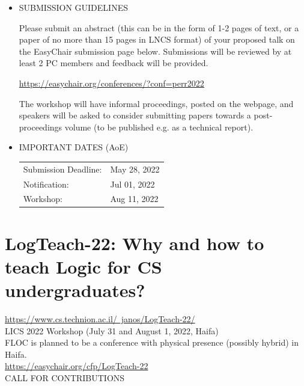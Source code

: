 \documentclass[prodmode,acmtecs]{acmsmall} %
\begin{document}
\begin{itemize}
\item  SUBMISSION GUIDELINES 
 
  Please submit an abstract (this can be in the form of 1-2 pages of text, or a paper of no more than 15 pages in LNCS format) of your proposed talk on the EasyChair submission page below. Submissions will be reviewed by at least 2 PC members and feedback will be provided. 
 
 \href{https://easychair.org/conferences/?conf=perr2022}{https://easychair.org/conferences/?conf=perr2022} 
 
  The workshop will have informal proceedings, posted on the webpage, and speakers will be asked to consider submitting papers towards a post-proceedings volume (to be published e.g. as a technical report). 
 
\item  IMPORTANT DATES (AoE)  
 
\begin{tabulary}{\linewidth}{LL}Submission Deadline:  & May 28, 2022 \\
Notification:  & Jul 01, 2022 \\
Workshop:  & Aug 11, 2022 \\
\end{tabulary}
 
\end{itemize}\section{LogTeach-22: Why and how to teach Logic for CS undergraduates? }\label{LogTeach22}  \href{https://www.cs.technion.ac.il/~janos/LogTeach-22/}{https://www.cs.technion.ac.il/~janos/LogTeach-22/} \\ 
  LICS 2022 Workshop (July 31 and August 1, 2022, Haifa)\\ 
  FLOC is planned to be a conference with physical presence (possibly hybrid) in Haifa.\\ 
  \href{https://easychair.org/cfp/LogTeach-22}{https://easychair.org/cfp/LogTeach-22}\\ 
CALL FOR CONTRIBUTIONS  
\end{document}
